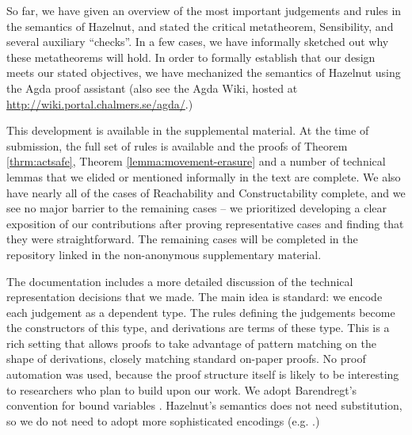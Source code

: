 So far, we have given an overview of the most important judgements and rules in
the semantics of Hazelnut, and stated the critical metatheorem, Sensibility, and several auxiliary ``checks''. In a few
cases, we have informally sketched out why these metatheorems will hold. In order to formally establish that our design meets our stated objectives, we
have mechanized the semantics of Hazelnut using the Agda proof assistant \cite{norell:thesis} (also see the Agda Wiki, hosted
at \url{http://wiki.portal.chalmers.se/agda/}.)

This development is available in the supplemental material. At the time of submission, the full set of rules is available and the proofs of Theorem \ref{thrm:actsafe}, Theorem \ref{lemma:movement-erasure} and a number of technical lemmas that we elided or mentioned informally in the text are complete. We also have nearly all of the cases of Reachability and Constructability complete, and we see no major barrier to the remaining cases -- we prioritized developing a clear exposition of our contributions after proving representative cases and finding that they were straightforward. The remaining cases will be completed in the repository linked in the non-anonymous supplementary material.

The documentation 
includes a more detailed discussion of the technical representation
decisions that we made. The main idea is standard: we encode each judgement as a
dependent type. The rules defining the judgements become the constructors of this
type, and derivations are terms of these type. This is a rich
setting that allows proofs to take advantage of pattern matching on the
shape of derivations, closely matching standard on-paper proofs. No proof automation was used, because the proof structure itself is likely to be interesting to researchers who plan to build upon our work. 
We adopt Barendregt's convention for
bound variables \cite{urban}. Hazelnut's semantics does not need substitution, so we do not need to adopt more sophisticated encodings (e.g. \cite{lh09unibind,Pouillard11}.)
